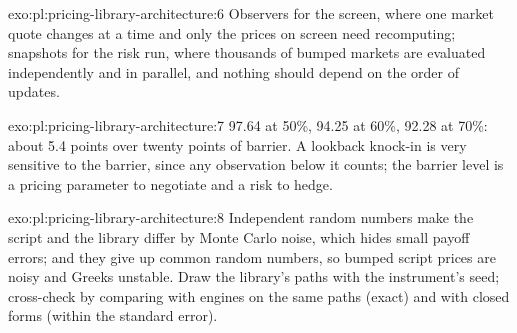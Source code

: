 \begin{solution}{exo:pl:pricing-library-architecture:6}
Observers for the screen, where one market quote changes at a time and only the prices on screen need recomputing; snapshots for the risk run,
where thousands of bumped markets are evaluated independently and in parallel, and nothing should depend on the order of updates.
\end{solution}

\begin{solution}{exo:pl:pricing-library-architecture:7}
97.64 at 50\%, 94.25 at 60\%, 92.28 at 70\%: about 5.4 points over twenty points of barrier. A lookback knock-in is very sensitive to the
barrier, since any observation below it counts; the barrier level is a pricing parameter to negotiate and a risk to hedge.
\end{solution}

\begin{solution}{exo:pl:pricing-library-architecture:8}
Independent random numbers make the script and the library differ by Monte Carlo noise, which hides small payoff errors; and they give up
common random numbers, so bumped script prices are noisy and Greeks unstable. Draw the library's paths with the instrument's seed; cross-check
by comparing with engines on the same paths (exact) and with closed forms (within the standard error).
\end{solution}

